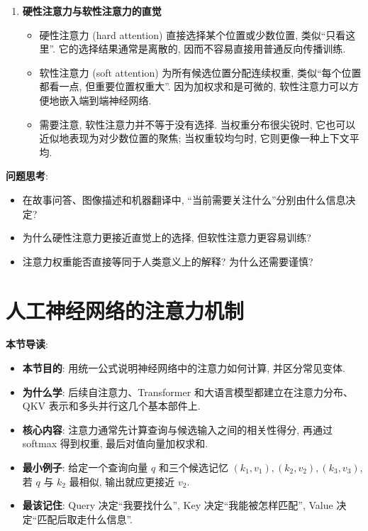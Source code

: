 \documentclass{../nndlcourse}
\begin{document}
\begin{enumerate}
\begin{itemize}
    \end{itemize}
  \item \textbf{硬性注意力与软性注意力的直觉}
    \begin{itemize}
      \item 硬性注意力 (hard attention) 直接选择某个位置或少数位置, 类似“只看这里”. 它的选择结果通常是离散的, 因而不容易直接用普通反向传播训练.
      \item 软性注意力 (soft attention) 为所有候选位置分配连续权重, 类似“每个位置都看一点, 但重要位置权重大”. 因为加权求和是可微的, 软性注意力可以方便地嵌入端到端神经网络.
      \item 需要注意, 软性注意力并不等于没有选择. 当权重分布很尖锐时, 它也可以近似地表现为对少数位置的聚焦; 当权重较均匀时, 它则更像一种上下文平均.
    \end{itemize}
\end{enumerate}

\textbf{问题思考}:
\begin{itemize}
  \item 在故事问答、图像描述和机器翻译中, “当前需要关注什么”分别由什么信息决定?
  \item 为什么硬性注意力更接近直觉上的选择, 但软性注意力更容易训练?
  \item 注意力权重能否直接等同于人类意义上的解释? 为什么还需要谨慎?
\end{itemize}

\section{人工神经网络的注意力机制}

\textbf{本节导读}:
\begin{itemize}
  \item \textbf{本节目的}: 用统一公式说明神经网络中的注意力如何计算, 并区分常见变体.
  \item \textbf{为什么学}: 后续自注意力、Transformer 和大语言模型都建立在注意力分布、QKV 表示和多头并行这几个基本部件上.
  \item \textbf{核心内容}: 注意力通常先计算查询与候选输入之间的相关性得分, 再通过 softmax 得到权重, 最后对值向量加权求和.
  \item \textbf{最小例子}: 给定一个查询向量 $q$ 和三个候选记忆 $(k_1,v_1),(k_2,v_2),(k_3,v_3)$, 若 $q$ 与 $k_2$ 最相似, 输出就应更接近 $v_2$.
  \item \textbf{最该记住}: Query 决定“我要找什么”, Key 决定“我能被怎样匹配”, Value 决定“匹配后取走什么信息”.
\end{itemize}
\end{document}
